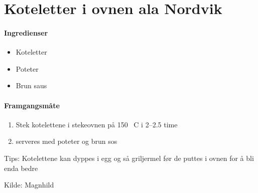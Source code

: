 \section{Koteletter i ovnen ala Nordvik}


\paragraph{Ingredienser}
\begin{itemize}[noitemsep]
	\item Koteletter
	\item Poteter
	\item Brun saus
\end{itemize}

\paragraph{Framgangsmåte}
\begin{enumerate}[noitemsep]
	\item Stek kotelettene i stekeovnen på 150 \degree~C i 2--2.5 time
	\item serveres med poteter og brun sos
\end{enumerate}

Tips: Kotelettene kan dyppes i egg og så griljermel før de puttes i ovnen for å bli enda bedre

Kilde: Magnhild
